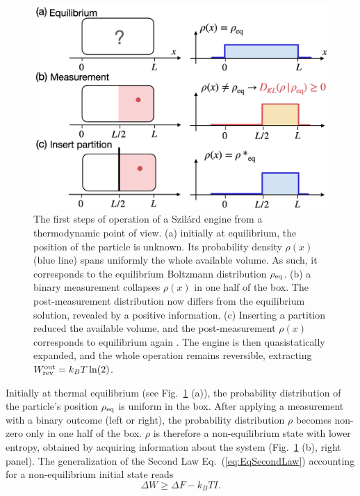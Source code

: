 \documentclass[aps, twocolumn,floatfix,showpacs, superscriptaddress]{revtex4-2}
\newcommand{\se}{Szil\'ard engine }
\begin{document}
\begin{figure}
    \centering
    \includegraphics[scale = 0.24]{Szilard.png}
    \caption{The first steps of operation of a \se from a thermodynamic point of view. (a) initially at equilibrium, the position of the particle is unknown. Its probability density $\rho(x)$ (blue line) spans uniformly the whole available volume. As such, it corresponds to the equilibrium Boltzmann distribution $\rho_{\rm eq}$. (b) a binary measurement collapses $\rho(x)$ in one half of the box. The post-measurement distribution now differs from the equilibrium solution, revealed by a positive information.
    (c) Inserting a partition reduced the available volume, and the post-measurement $\rho(x)$ corresponds to equilibrium again \cite{Parrondo_2015}. The engine is then quasistatically expanded, and the whole operation remains reversible, extracting $W^{\rm out}_{\rm rev} = k_B T \ln(2)$.}
    \label{fig:Szilard}
\end{figure}
Initially at thermal equilibrium (see Fig.~\ref{fig:Szilard} (a)), the probability distribution of the particle's position $\rho_{\rm eq}$ is uniform in the box.
After applying a measurement with a binary outcome (left or right), the probability distribution $\rho$ becomes non-zero only in one half of the box.
$\rho$ is therefore a non-equilibrium state with lower entropy, obtained by acquiring information about the system (Fig.~\ref{fig:Szilard} (b), right panel).
The generalization of the Second Law Eq.~(\ref{eq:EqSecondLaw}) accounting for a non-equilibrium initial state reads \cite{esposito_second_2011}
\begin{equation}
    \Delta W \geq \Delta F - k_B T I.
    \label{eq:NeqSecondLaw}
\end{equation}
\end{document}
